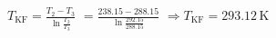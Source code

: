 \( T_{\text{KF}} = \frac{T_2 - T_3}{\ln \frac{T_2}{T_3}} \)  
\( = \frac{238.15 - 288.15}{\ln \frac{292.15}{288.15}} \)  
\( \Rightarrow T_{\text{KF}} = 293.12 \, \text{K} \)